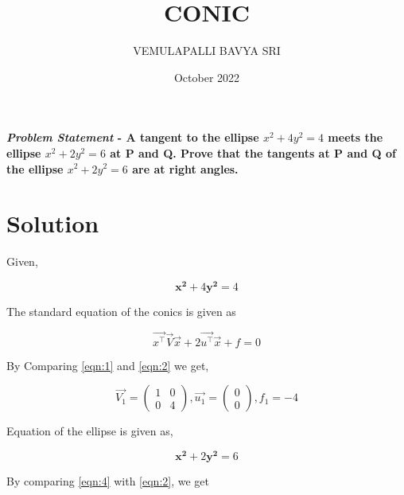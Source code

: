 \documentclass[journal,10pt,twocolumn]{article}
\title{\textbf{CONIC}}
\author{VEMULAPALLI BAVYA SRI}
\date{October 2022}
\let\vec\mathbf
\newcommand{\myvec}[1]{\ensuremath{\begin{pmatrix}#1\end{pmatrix}}}
\begin{document}
\maketitle
\paragraph{\textit{Problem Statement} - A tangent to the ellipse $x^2 + 4y^2 = 4$ meets the ellipse $x^2 + 2y^2 = 6$ at P and Q. Prove that the tangents at P and Q of the ellipse $x^2 + 2y^2 = 6$ are at right angles.}
  
\section{Solution}

    Given, 
    
    \begin{equation}
    \label{eqn:1}
        \vec{x^2} + 4\vec{y^2} =  4
    \end{equation}
    
    \begin{flushleft}
        The standard equation of the conics is given as
    \end{flushleft}
    
    \begin{equation}
    \label{eqn:2}
        \Vec{x^\top}\Vec{V}\Vec{x} + 2\Vec{u^\top}\Vec{x} + f = 0
    \end{equation}
    
    \begin{flushleft}
        By Comparing \eqref{eqn:1} and \eqref{eqn:2} we get,
    \end{flushleft}
    
    \begin{equation}
    \label{eqn:3}
        \Vec{V_1} = \myvec{1 & 0 \\ 0 & 4} , \Vec{u_1} = \myvec{0 \\ 0} , f_1 = -4
    \end{equation}

    \begin{flushleft}
        Equation of the ellipse is given as,
    \end{flushleft}
    
    \begin{equation}
    \label{eqn:4}
        \vec{x^2} + 2\vec{y^2} = 6
    \end{equation}

    \begin{flushleft}
        By comparing \eqref{eqn:4} with \eqref{eqn:2}, we get
    \end{flushleft}
    
\end{document}
